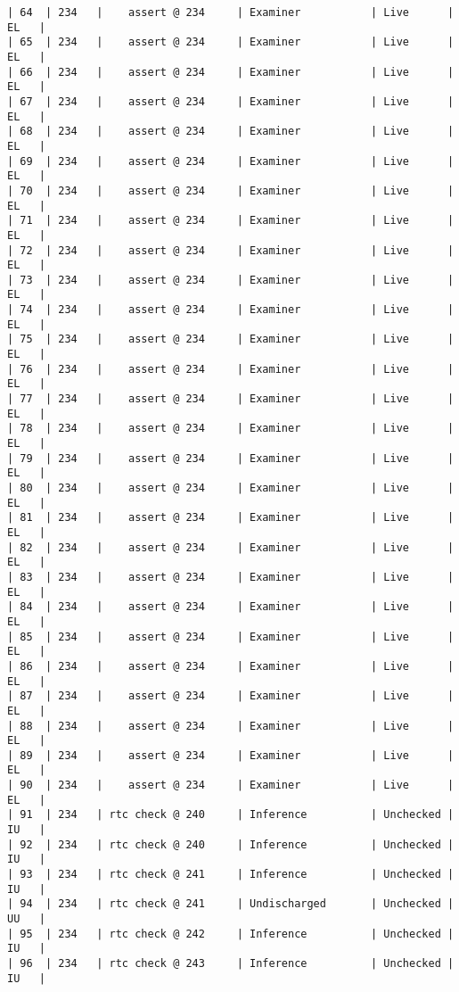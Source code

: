 \begin{lstlisting}[frame=single, gobble=0, caption={POGS report for PCA Pump prototype}]
| 64  | 234   |    assert @ 234     | Examiner           | Live      |   EL   |
| 65  | 234   |    assert @ 234     | Examiner           | Live      |   EL   |
| 66  | 234   |    assert @ 234     | Examiner           | Live      |   EL   |
| 67  | 234   |    assert @ 234     | Examiner           | Live      |   EL   |
| 68  | 234   |    assert @ 234     | Examiner           | Live      |   EL   |
| 69  | 234   |    assert @ 234     | Examiner           | Live      |   EL   |
| 70  | 234   |    assert @ 234     | Examiner           | Live      |   EL   |
| 71  | 234   |    assert @ 234     | Examiner           | Live      |   EL   |
| 72  | 234   |    assert @ 234     | Examiner           | Live      |   EL   |
| 73  | 234   |    assert @ 234     | Examiner           | Live      |   EL   |
| 74  | 234   |    assert @ 234     | Examiner           | Live      |   EL   |
| 75  | 234   |    assert @ 234     | Examiner           | Live      |   EL   |
| 76  | 234   |    assert @ 234     | Examiner           | Live      |   EL   |
| 77  | 234   |    assert @ 234     | Examiner           | Live      |   EL   |
| 78  | 234   |    assert @ 234     | Examiner           | Live      |   EL   |
| 79  | 234   |    assert @ 234     | Examiner           | Live      |   EL   |
| 80  | 234   |    assert @ 234     | Examiner           | Live      |   EL   |
| 81  | 234   |    assert @ 234     | Examiner           | Live      |   EL   |
| 82  | 234   |    assert @ 234     | Examiner           | Live      |   EL   |
| 83  | 234   |    assert @ 234     | Examiner           | Live      |   EL   |
| 84  | 234   |    assert @ 234     | Examiner           | Live      |   EL   |
| 85  | 234   |    assert @ 234     | Examiner           | Live      |   EL   |
| 86  | 234   |    assert @ 234     | Examiner           | Live      |   EL   |
| 87  | 234   |    assert @ 234     | Examiner           | Live      |   EL   |
| 88  | 234   |    assert @ 234     | Examiner           | Live      |   EL   |
| 89  | 234   |    assert @ 234     | Examiner           | Live      |   EL   |
| 90  | 234   |    assert @ 234     | Examiner           | Live      |   EL   |
| 91  | 234   | rtc check @ 240     | Inference          | Unchecked |   IU   |
| 92  | 234   | rtc check @ 240     | Inference          | Unchecked |   IU   |
| 93  | 234   | rtc check @ 241     | Inference          | Unchecked |   IU   |
| 94  | 234   | rtc check @ 241     | Undischarged       | Unchecked |   UU   |
| 95  | 234   | rtc check @ 242     | Inference          | Unchecked |   IU   |
| 96  | 234   | rtc check @ 243     | Inference          | Unchecked |   IU   |

\end{lstlisting}
